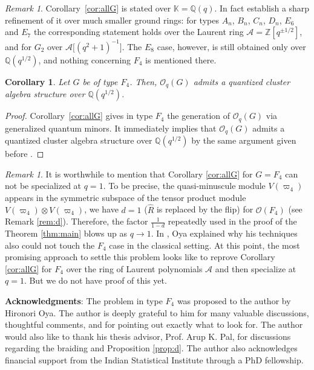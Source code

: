 \documentclass[12pt]{amsart}
\theoremstyle{plain}
\newtheorem{corollary}[theorem]{Corollary}
\theoremstyle{remark}
\newtheorem{remark}[theorem]{Remark}
\newcommand{\vp}{\varpi}
\newcommand{\K}{\mathbb{K}}
\begin{document}
\begin{remark}
\label{srings}
Corollary~\ref{cor:allG} is stated over $\K=\mathbb Q(q)$. In fact \cite{OQY}
establish a sharp refinement of it over much smaller ground rings: for types $A_n$,
$B_n$, $C_n$, $D_n$, $E_6$ and $E_7$ the corresponding statement holds over the
Laurent ring $\mathcal A=\mathbb Z[q^{\pm1/2}]$, and for $G_2$ over
$\mathcal A\big[(q^2+1)^{-1}\big]$. The $E_8$ case, however, is still obtained only
over $\mathbb Q(q^{1/2})$, and nothing concerning $F_4$ is mentioned there.
\end{remark}

\begin{corollary}\label{cor:cluster}
Let $G$ be of type $F_4$. Then, $\mathcal{O}_q(G)$ admits a quantized cluster
algebra structure over $\mathbb Q(q^{1/2})$.
\end{corollary}

\begin{proof}
Corollary~\ref{cor:allG} gives in type $F_4$ the generation of $\mathcal{O}_q(G)$ via generalized quantum minors. It immediately implies that $\mathcal{O}_q(G)$ admits a quantized cluster algebra structure over $\mathbb{Q}(q^{1/2})$ by the same argument given before
\cite[Theorem~5.4]{OQY}.
\end{proof}

\begin{remark}
It is worthwhile to mention that Corollary \ref{cor:allG} for $G=F_4$ can not be specialized at $q=1$. To be precise, the quasi-minuscule module $V(\vp_4)$ appears in the symmetric subspace of the tensor product module $V(\vp_4)\otimes V(\vp_4)$, we have $d=1$ ($\hat{R}$ is replaced by the flip)  for $\mathcal{O}(F_4)$ (see Remark \ref{rem:d}). Therefore, the factor $\frac{1}{1-d}$ repeatedly used in the proof of the Theorem \ref{thm:main} blows up as $q\to 1$. In \cite[Remark 3.10]{Oya}, Oya explained why his techniques also could not touch the $F_4$ case in the classical setting. At this point, the most promising approach to settle this problem looks like to reprove Corollary \ref{cor:allG} for $F_4$ over the ring of Laurent polynomials $\mathcal{A}$ and then specialize at $q=1$. But we do not have proof of this yet. 
\end{remark}

\medskip 

\noindent \textbf{Acknowledgments}: The problem in type $F_4$ was proposed to the author by Hironori Oya. The author is deeply grateful to him for many valuable discussions, thoughtful comments, and for pointing out exactly what to look for. The author would also like to thank his thesis advisor, Prof. Arup K. Pal, for discussions regarding the braiding and Proposition \ref{prop:d}. The author also acknowledges financial support from the Indian Statistical Institute through a PhD fellowship. 
\end{document}
